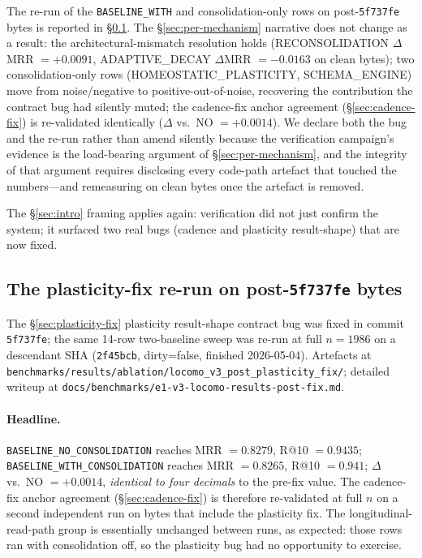 \documentclass[11pt]{article}
\begin{document}
The re-run of the \texttt{BASELINE\_WITH} and consolidation-only
rows on post-\texttt{5f737fe} bytes is reported in
\S\ref{sec:locomo-postfix}.  The \S\ref{sec:per-mechanism} narrative
does not change as a result: the architectural-mismatch resolution
holds (RECONSOLIDATION $\Delta$MRR $= +0.0091$, ADAPTIVE\_DECAY
$\Delta$MRR $= -0.0163$ on clean bytes); two consolidation-only rows
(HOMEOSTATIC\_PLASTICITY, SCHEMA\_ENGINE) move from noise/negative to
positive-out-of-noise, recovering the contribution the contract bug
had silently muted; the cadence-fix anchor agreement
(\S\ref{sec:cadence-fix}) is re-validated identically
($\Delta$ vs.\ NO $= +0.0014$).  We declare both the bug and the
re-run rather than amend silently because the verification campaign's
evidence is the load-bearing argument of \S\ref{sec:per-mechanism},
and the integrity of that argument requires disclosing every
code-path artefact that touched the numbers---and remeasuring on
clean bytes once the artefact is removed.

The \S\ref{sec:intro} framing applies again: verification did not
just confirm the system; it surfaced two real bugs (cadence and
plasticity result-shape) that are now fixed.

\subsection{The plasticity-fix re-run on post-\texttt{5f737fe} bytes}
\label{sec:locomo-postfix}

The \S\ref{sec:plasticity-fix} plasticity result-shape contract bug
was fixed in commit \texttt{5f737fe}; the same 14-row two-baseline
sweep was re-run at full $n = 1986$ on a descendant SHA
(\texttt{2f45bcb}, dirty=false, finished 2026-05-04).  Artefacts at
\texttt{benchmarks/results/ablation/locomo\_v3\_post\_plasticity\_fix/};
detailed writeup at
\texttt{docs/benchmarks/e1-v3-locomo-results-post-fix.md}.

\paragraph{Headline.} \texttt{BASELINE\_NO\_CONSOLIDATION} reaches
MRR $= 0.8279$, R@10 $= 0.9435$;
\texttt{BASELINE\_WITH\_CONSOLIDATION} reaches MRR $= 0.8265$,
R@10 $= 0.941$; $\Delta$ vs.\ NO $= +0.0014$, \emph{identical to four
decimals} to the pre-fix value.  The cadence-fix anchor agreement
(\S\ref{sec:cadence-fix}) is therefore re-validated at full $n$ on a
second independent run on bytes that include the plasticity fix.
The longitudinal-read-path group is essentially unchanged between
runs, as expected: those rows ran with consolidation off, so the
plasticity bug had no opportunity to exercise.
\end{document}
